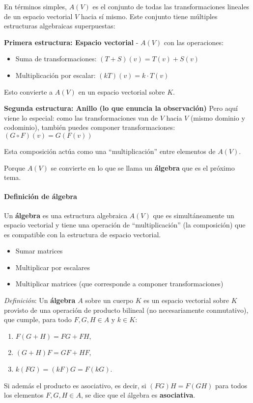 En términos simples, \(A(V)\) es el conjunto de todas las transformaciones lineales de un espacio vectorial \(V\) hacia sí mismo. Este conjunto tiene múltiples estructuras algebraicas superpuestas:

\noindent\textbf{Primera estructura: Espacio vectorial} - \(A(V)\) con las operaciones:
\begin{itemize}
  \item Suma de transformaciones: \((T + S)(v) = T(v) + S(v)\)
  \item Multiplicación por escalar: \((kT)(v) = k\cdot T(v)\)
\end{itemize}
Esto convierte a \(A(V)\) en un espacio vectorial sobre \(K\).

\textbf{Segunda estructura: Anillo (lo que enuncia la observación)}
Pero aquí viene lo especial: como las transformaciones van de \(V\) hacia \(V\) (mismo dominio y codominio), también puedes componer transformaciones: \((G \circ F)(v)=G(F(v))\)

Esta composición actúa como una ``multiplicación'' entre elementos de \(A(V)\).

\begin{tcolorbox}[title=¿Por qué es importante esta estructura múltiple?]
  Porque \(A(V)\) se convierte en lo que se llama un \textbf{álgebra} que es el próximo tema.
\end{tcolorbox}

\paragraph{Definición de álgebra}

Un \textbf{álgebra} es una estructura algebraica \(A(V)\) que es simultáneamente un espacio vectorial y tiene una operación de ``multiplicación'' (la composición) que es compatible con la estructura de espacio vectorial.

\begin{itemize}
  \item Sumar matrices
  \item Multiplicar por escalares  
  \item Multiplicar matrices (que corresponde a componer transformaciones)
\end{itemize}

\textit{Definición}: Un \textbf{álgebra} \(A\) sobre un cuerpo \(K\) es un espacio vectorial sobre \(K\) provisto de una operación de producto bilineal (no necesariamente conmutativo), que cumple, para todo \(F, G, H \in A\) y \(k \in K\):
\begin{enumerate}
  \item \(F(G + H) = FG + FH\),
  \item \((G + H)F = GF + HF\),
  \item \(k(FG) = (kF)G = F(kG)\).
\end{enumerate}
Si además el producto es asociativo, es decir, si \((FG)H = F(GH)\) para todos los elementos \(F, G, H \in A\), se dice que el álgebra es \textbf{asociativa}.

